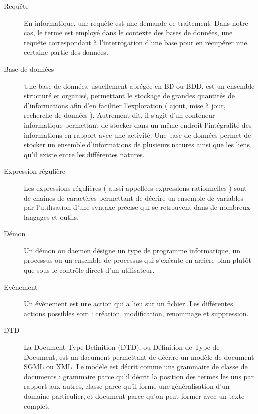 \begin{description}
\item[Requête]
 En informatique, une requête est une demande de traitement. Dans notre cas, le
terme est employé dans le contexte des bases de données, une requête
correspondant à l'interrogation d'une base pour en récupérer une certaine partie
des données.
 
\item[Base de données]
 Une base de données, usuellement abrégée en BD ou BDD, est un ensemble
structuré et organisé, permettant le stockage de grandes quantités de
d'informations afin d'en faciliter l'exploration ( ajout, mise à jour, recherche
de données ). Autrement dit, il s’agit d’un conteneur informatique permettant de
stocker dans un même endroit l'intégralité des informations en rapport avec une
activité. Une base de données permet de stocker un ensemble d'informations de
plusieurs natures ainsi que les liens qu'il existe entre les différentes
natures.

\item[Expression régulière]
 Les expressions régulières ( aussi appellées expressions rationnelles ) sont de
chaines de caractères permettant de décrire un ensemble de variables par
l'utilisation d'une syntaxe précise qui se retrouvent dans de nombreux langages
et outils.
 
\item[Démon]
 Un démon ou daemon désigne un type de programme informatique, un processus ou
un ensemble de processus qui s'exécute en arrière-plan plutôt que sous le
contrôle direct d'un utilisateur.

\item[Evènement]
 Un évènement est une action qui a lieu sur un fichier. Les différentes actions 
 possibles sont : création, modification, renommage et suppression.
 
 \item[DTD]
 La Document Type Definition (DTD), ou Définition de Type de Document, est un 
document permettant de décrire un modèle de document SGML ou XML. Le modèle est 
décrit comme une grammaire de classe de documents : grammaire parce qu'il 
décrit la position des termes les uns par rapport aux autres, classe parce qu'il 
forme une généralisation d'un domaine particulier, et document parce qu'on peut 
former avec un texte complet.

\end{description}

